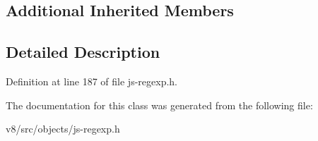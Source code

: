 \subsection*{Additional Inherited Members}


\subsection{Detailed Description}


Definition at line 187 of file js-\/regexp.\+h.



The documentation for this class was generated from the following file\+:\begin{DoxyCompactItemize}
\item 
v8/src/objects/js-\/regexp.\+h\end{DoxyCompactItemize}
